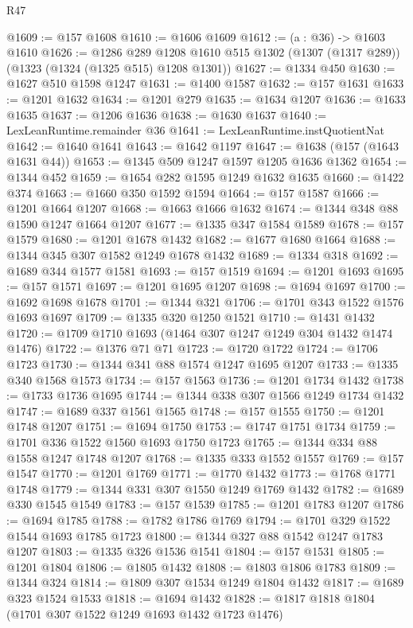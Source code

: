 \begin{lexlean}{R47}
\begin{coremodule}
@1609 := @157 @1608
@1610 := @1606 @1609
@1612 := (a : @36) -> @1603 @1610
@1626 := @1286
    @289
    @1208
    @1610
    @515
    @1302
    (@1307 (@1317 @289))
    (@1323 (@1324 (@1325 @515) @1208 @1301))
@1627 := @1334 @450
@1630 := @1627 @510 @1598 @1247
@1631 := @1400 @1587
@1632 := @157 @1631
@1633 := @1201 @1632
@1634 := @1201 @279
@1635 := @1634 @1207
@1636 := @1633 @1635
@1637 := @1206 @1636
@1638 := @1630 @1637
@1640 := LexLeanRuntime.remainder @36
@1641 := LexLeanRuntime.instQuotientNat
@1642 := @1640 @1641
@1643 := @1642 @1197
@1647 := @1638 (@157 (@1643 @1631 @44))
@1653 := @1345 @509 @1247 @1597 @1205 @1636 @1362
@1654 := @1344 @452
@1659 := @1654 @282 @1595 @1249 @1632 @1635
@1660 := @1422 @374
@1663 := @1660 @350 @1592 @1594
@1664 := @157 @1587
@1666 := @1201 @1664 @1207
@1668 := @1663 @1666 @1632
@1674 := @1344 @348 @88 @1590 @1247 @1664 @1207
@1677 := @1335 @347 @1584 @1589
@1678 := @157 @1579
@1680 := @1201 @1678 @1432
@1682 := @1677 @1680 @1664
@1688 := @1344 @345 @307 @1582 @1249 @1678 @1432
@1689 := @1334 @318
@1692 := @1689 @344 @1577 @1581
@1693 := @157 @1519
@1694 := @1201 @1693
@1695 := @157 @1571
@1697 := @1201 @1695 @1207
@1698 := @1694 @1697
@1700 := @1692 @1698 @1678
@1701 := @1344 @321
@1706 := @1701 @343 @1522 @1576 @1693 @1697
@1709 := @1335 @320 @1250 @1521
@1710 := @1431 @1432
@1720 := @1709 @1710 @1693 (@1464 @307 @1247 @1249 @304 @1432 @1474 @1476)
@1722 := @1376 @71 @71
@1723 := @1720 @1722
@1724 := @1706 @1723
@1730 := @1344 @341 @88 @1574 @1247 @1695 @1207
@1733 := @1335 @340 @1568 @1573
@1734 := @157 @1563
@1736 := @1201 @1734 @1432
@1738 := @1733 @1736 @1695
@1744 := @1344 @338 @307 @1566 @1249 @1734 @1432
@1747 := @1689 @337 @1561 @1565
@1748 := @157 @1555
@1750 := @1201 @1748 @1207
@1751 := @1694 @1750
@1753 := @1747 @1751 @1734
@1759 := @1701 @336 @1522 @1560 @1693 @1750 @1723
@1765 := @1344 @334 @88 @1558 @1247 @1748 @1207
@1768 := @1335 @333 @1552 @1557
@1769 := @157 @1547
@1770 := @1201 @1769
@1771 := @1770 @1432
@1773 := @1768 @1771 @1748
@1779 := @1344 @331 @307 @1550 @1249 @1769 @1432
@1782 := @1689 @330 @1545 @1549
@1783 := @157 @1539
@1785 := @1201 @1783 @1207
@1786 := @1694 @1785
@1788 := @1782 @1786 @1769
@1794 := @1701 @329 @1522 @1544 @1693 @1785 @1723
@1800 := @1344 @327 @88 @1542 @1247 @1783 @1207
@1803 := @1335 @326 @1536 @1541
@1804 := @157 @1531
@1805 := @1201 @1804
@1806 := @1805 @1432
@1808 := @1803 @1806 @1783
@1809 := @1344 @324
@1814 := @1809 @307 @1534 @1249 @1804 @1432
@1817 := @1689 @323 @1524 @1533
@1818 := @1694 @1432
@1828 := @1817 @1818 @1804 (@1701 @307 @1522 @1249 @1693 @1432 @1723 @1476)

\end{coremodule}
\end{lexlean}

